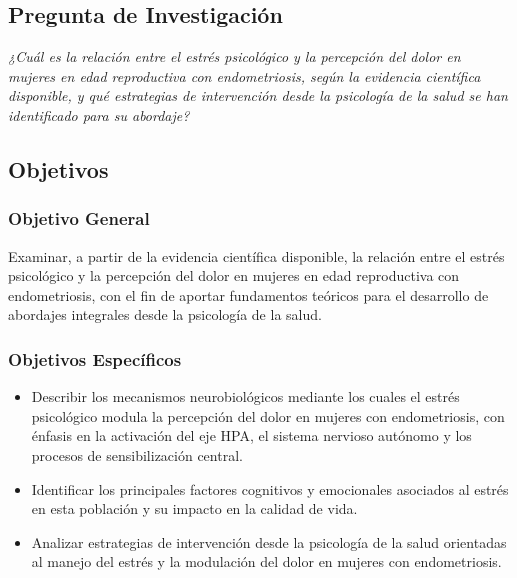 \documentclass[12pt, a4paper]{article}
\begin{document}
\subsection{Pregunta de Investigación}

\begin{mdframed}[style=pregunta]
\noindent\itshape
¿Cuál es la relación entre el estrés psicológico y la percepción del dolor en mujeres en
edad reproductiva con endometriosis, según la evidencia científica disponible, y qué
estrategias de intervención desde la psicología de la salud se han identificado para su
abordaje?
\end{mdframed}

\subsection{Objetivos}

\subsubsection{Objetivo General}

Examinar, a partir de la evidencia científica disponible, la relación entre el estrés
psicológico y la percepción del dolor en mujeres en edad reproductiva con endometriosis, con
el fin de aportar fundamentos teóricos para el desarrollo de abordajes integrales desde la
psicología de la salud.

\subsubsection{Objetivos Específicos}

\begin{itemize}
  \item Describir los mecanismos neurobiológicos mediante los cuales el estrés psicológico
        modula la percepción del dolor en mujeres con endometriosis, con énfasis en la
        activación del eje HPA, el sistema nervioso autónomo y los procesos de
        sensibilización central.

  \item Identificar los principales factores cognitivos y emocionales asociados al estrés en
        esta población y su impacto en la calidad de vida.

  \item Analizar estrategias de intervención desde la psicología de la salud orientadas al
        manejo del estrés y la modulación del dolor en mujeres con endometriosis.
\end{itemize}
\end{document}
